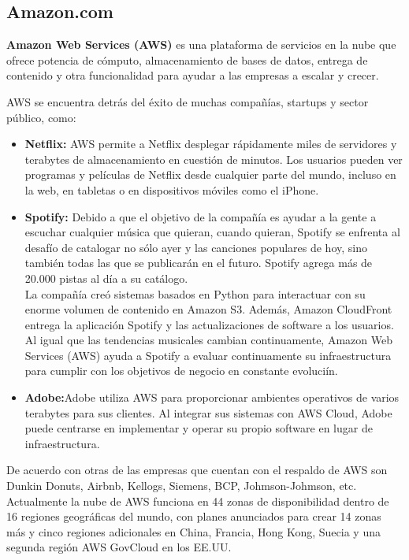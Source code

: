 \documentclass[a4paper, 12pt]{report}
\begin{document}
\subsection{Amazon.com}
\begin{justify}
{\bf{Amazon Web Services (AWS)}} es una plataforma de servicios en la nube que ofrece potencia de c\'omputo, almacenamiento de bases de datos, entrega de contenido y otra funcionalidad para ayudar a las empresas a escalar y crecer. \citep{aws}

AWS se encuentra detrás del \'exito de muchas compañías, startups y sector p\'ublico, como: 
\begin{itemize}
	\item  \textbf{Netflix:} AWS permite a Netflix desplegar rápidamente miles de servidores y terabytes de almacenamiento en cuesti\'on de minutos. Los usuarios pueden ver programas y películas de Netflix desde cualquier parte del mundo, incluso en la web, en tabletas o en dispositivos móviles como el iPhone.\citep{awscasos}
	\item  \textbf{Spotify:}	Debido a que el objetivo de la compañía es ayudar a la gente a escuchar cualquier música que quieran, cuando quieran, Spotify se enfrenta al desaf\'io de catalogar no sólo ayer y las canciones populares de hoy, sino también todas las que se publicarán en el futuro. Spotify agrega más de 20.000 pistas al día a su catálogo. \\	
La  compa\~{n}\'ia cre\'o sistemas basados en Python para interactuar con su enorme volumen de contenido en Amazon S3. Además, Amazon CloudFront entrega la aplicación Spotify y las actualizaciones de software a los usuarios. \\ Al igual que las tendencias musicales cambian continuamente, Amazon Web Services (AWS) ayuda a Spotify a evaluar continuamente su infraestructura para cumplir con los objetivos de negocio en constante evoluci\'in.\citep{awscasos}
	\item  \textbf{Adobe:}Adobe utiliza AWS para proporcionar ambientes operativos de varios terabytes para sus clientes. Al integrar sus sistemas con AWS Cloud, Adobe puede centrarse en implementar y operar su propio software en lugar de infraestructura.\citep{awscasos}
\end{itemize}
De acuerdo con \cite{awscasos} otras  de las empresas que cuentan con el respaldo de AWS son  Dunkin Donuts, Airbnb, Kellogs, Siemens, BCP, Johmson-Johmson, etc. 
\\Actualmente la nube de AWS funciona en 44 zonas de disponibilidad dentro de 16 regiones geogr\'aficas del mundo, con planes anunciados para crear 14 zonas m\'as y cinco regiones adicionales en China, Francia, Hong Kong, Suecia y una segunda regi\'on AWS GovCloud en los EE.UU. \citep{aws}


\end{justify}
\end{document}
